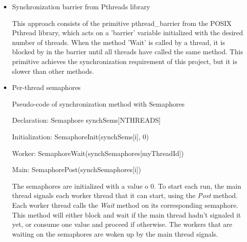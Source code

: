 \begin{itemize}

%
%
%


\item Synchronization barrier from Pthreads library

This approach consists of the primitive pthread\_barrier from the POSIX Pthread library, which acts on a 'barrier' variable initialized with the desired number of threads. When the method 'Wait' is called by a thread, it is blocked by in the barrier until all threads have called the same method. 
This primitive achieves the synchronization requirement of this project, but it is slower than other methods.


\item Per-thread semaphores

\begin{algorithm}[htb!]
\caption{Pseudo-code of synchronization method with Semaphores}
\label{code-semaphores}

\begin{algorithmic}
	\LeftComment Declaration:
	\State Semaphore synchSems[NTHREADS]
		
	\LeftComment Initialization:
		\State SemaphoreInit(synchSems[i], 0)
	\EndFor
	
	\LeftComment Worker:
	\State SemaphoreWait(synchSemaphores[myThreadId])
	
	\LeftComment Main:
		\State SemaphorePost(synchSemaphores[i])
	\EndFor
\end{algorithmic}
\end{algorithm}


The semaphores are initialized with a value o 0. To start each run, the main thread signals each worker thread that it can start, using the \emph{Post} method. Each worker thread calls the \emph{Wait} method on its corresponding semaphore. This method will either block and wait if the main thread hadn't signaled it yet, or consume one value and proceed if otherwise. The workers that are waiting on the semaphores are woken up by the main thread signals.


\end{itemize}
